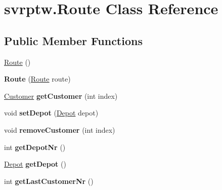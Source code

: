 \hypertarget{classsvrptw_1_1_route}{}\section{svrptw.\+Route Class Reference}
\label{classsvrptw_1_1_route}
\subsection*{Public Member Functions}
\begin{DoxyCompactItemize}
\item 
\hyperlink{classsvrptw_1_1_route_a7fbba374fb5acbb75f9a25b3de99d3ca}{Route} ()
\item 
{\bfseries Route} (\hyperlink{classsvrptw_1_1_route}{Route} route)\hypertarget{classsvrptw_1_1_route_af344d0e563087e59b051920d5185d413}{}\label{classsvrptw_1_1_route_af344d0e563087e59b051920d5185d413}

\item 
\hyperlink{classsvrptw_1_1_customer}{Customer} {\bfseries get\+Customer} (int index)\hypertarget{classsvrptw_1_1_route_a103fc163866663f4cf8a88f7145ce81d}{}\label{classsvrptw_1_1_route_a103fc163866663f4cf8a88f7145ce81d}

\item 
void {\bfseries set\+Depot} (\hyperlink{classsvrptw_1_1_depot}{Depot} depot)\hypertarget{classsvrptw_1_1_route_af6dc736fbf6491db051a4b2622f506bc}{}\label{classsvrptw_1_1_route_af6dc736fbf6491db051a4b2622f506bc}

\item 
void {\bfseries remove\+Customer} (int index)\hypertarget{classsvrptw_1_1_route_a17250ffc1d989cefc875c3d7cc72de96}{}\label{classsvrptw_1_1_route_a17250ffc1d989cefc875c3d7cc72de96}

\item 
int {\bfseries get\+Depot\+Nr} ()\hypertarget{classsvrptw_1_1_route_a40ce0b5f65ac2291dc6c368748c64a0f}{}\label{classsvrptw_1_1_route_a40ce0b5f65ac2291dc6c368748c64a0f}

\item 
\hyperlink{classsvrptw_1_1_depot}{Depot} {\bfseries get\+Depot} ()\hypertarget{classsvrptw_1_1_route_ac4a759cc39d23ace364158ee9c488d5c}{}\label{classsvrptw_1_1_route_ac4a759cc39d23ace364158ee9c488d5c}

\item 
int {\bfseries get\+Last\+Customer\+Nr} ()\hypertarget{classsvrptw_1_1_route_a4dbbc472fa40d6cd59c6b86a18bbbb1b}{}\label{classsvrptw_1_1_route_a4dbbc472fa40d6cd59c6b86a18bbbb1b}


\end{DoxyCompactItemize}
